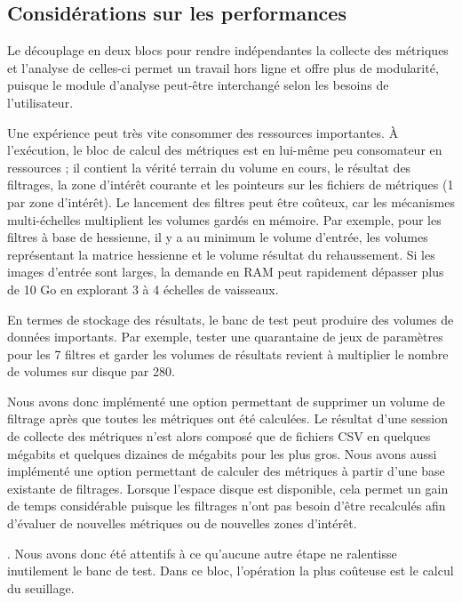 \subsection{Considérations sur les performances}
\label{sec:perf_bench}

Le découplage en deux blocs pour rendre indépendantes la collecte des métriques et l'analyse de celles-ci permet un travail hors ligne et offre plus de modularité, puisque le module d'analyse peut-être interchangé selon les besoins de l'utilisateur. 

Une expérience peut très vite consommer des ressources importantes. À l'exécution, le bloc de calcul des métriques est en lui-même peu consomateur en ressources ; il contient la vérité terrain du volume en cours, le résultat des filtrages, la zone d'intérêt courante et les pointeurs sur les fichiers de métriques (1 par zone d'intérêt). Le lancement des filtres peut être coûteux, car les mécanismes multi-échelles multiplient les volumes gardés en mémoire. Par exemple, pour les filtres à base de hessienne, il y a au minimum le volume d'entrée, les volumes représentant la matrice hessienne et le volume résultat du rehaussement. Si les images d'entrée sont larges, la demande en RAM peut rapidement dépasser plus de 10 Go en explorant 3 à 4 échelles de vaisseaux. 

En termes de stockage des résultats, le banc de test peut produire des volumes de données importants. Par exemple, tester une quarantaine de jeux de paramètres pour les 7 filtres et garder les volumes de résultats revient à multiplier le nombre de volumes sur disque par 280. 

Nous avons donc implémenté une option permettant de supprimer un volume de filtrage après que toutes les métriques ont été calculées. Le résultat d'une session de collecte des métriques n'est alors composé que de fichiers CSV en quelques mégabits et quelques dizaines de mégabits pour les plus gros. Nous avons aussi implémenté une option permettant de calculer des métriques à partir d'une base existante de filtrages. Lorsque l'espace disque est disponible, cela permet un gain de temps considérable puisque les filtrages n'ont pas besoin d'être recalculés afin d'évaluer de nouvelles métriques ou de nouvelles zones d'intérêt.

. Nous avons donc été attentifs à ce qu'aucune autre étape ne ralentisse inutilement le banc de test. Dans ce bloc, l'opération la plus coûteuse est le calcul du seuillage.

